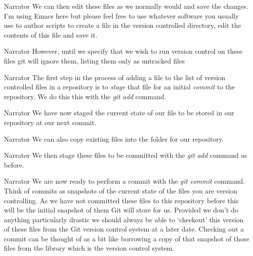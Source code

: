\documentclass{screenplay} %
\begin{document}
\begin{dialogue}{Narrator}
We can then edit these files as we normally would and save the changes.  I'm using Emacs here but please feel free to use whatever software you usually use to author scripts to create a file in the version controlled directory, edit the contents of this file and save it.
\end{dialogue}

\begin{dialogue}{Narrator}
However, until we specify that we wish to run version control on these files git will ignore them, listing them only as untracked files
\end{dialogue}

\begin{dialogue}{Narrator}
The first step in the process of adding a file to the list of version controlled files in a repository is to \textit{stage} that file for an initial \textit{commit} to the repository.  We do this this with the \textit{git add} command.
\end{dialogue}

\begin{dialogue}{Narrator}
We have now staged the current state of our file to be stored in our repository at our next commit.
\end{dialogue}

\begin{dialogue}{Narrator}
We can also copy existing files into the folder for our repository.
\end{dialogue}

\begin{dialogue}{Narrator}
We then stage these files to be committed with the \textit{git add} command as before. 
\end{dialogue}

\begin{dialogue}{Narrator}
We are now ready to perform a commit with the \textit{git commit} command.  Think of commits as snapshots of the current state of the files you are version controlling.  As we have not committed these files to this repository before this will be the initial snapshot of them Git will store for us.  Provided we don't do anything particularly drastic we should always be able to `checkout' this version of these files from the Git version control system at a later date. Checking out a commit can be thought of as a bit like borrowing a copy of that snapshot of those files from the library which is the version control system.
\end{dialogue}
\end{document}

